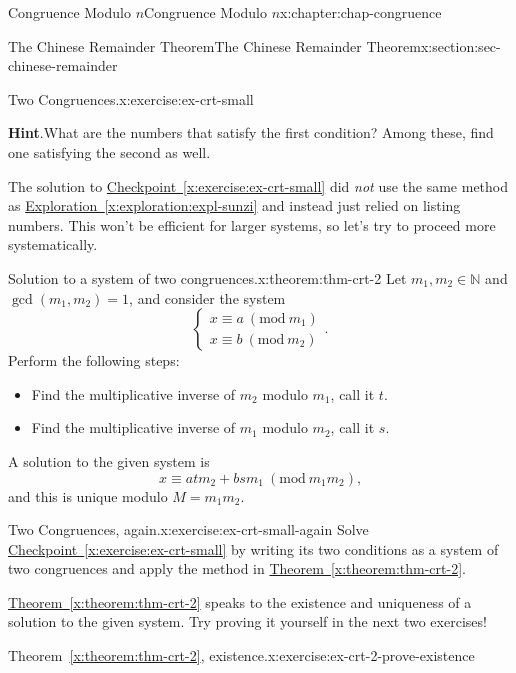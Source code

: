 \documentclass[oneside,10pt,]{book}
\newcommand{\blocktitlefont}{\relax}
\newcommand{\xreffont}{\relax}
\numberwithin{equation}{section}
\newcommand{\Mod}[1]{\ \left(\mathrm{mod}\ #1\right)}
\begin{document}
\begin{chapterptx}{Congruence Modulo \(n\)}{}{Congruence Modulo \(n\)}{}{}{x:chapter:chap-congruence}
\begin{sectionptx}{The Chinese Remainder Theorem}{}{The Chinese Remainder Theorem}{}{}{x:section:sec-chinese-remainder}
\begin{inlineexercise}{Two Congruences.}{x:exercise:ex-crt-small}
\par\smallskip%
\noindent\textbf{\blocktitlefont Hint}.\hypertarget{g:hint:id428586}{}\quad{}What are the numbers that satisfy the first condition? Among these, find one satisfying the second as well.%
\end{inlineexercise}
The solution to \hyperref[x:exercise:ex-crt-small]{Checkpoint~{\xreffont\ref{x:exercise:ex-crt-small}}} did \emph{not} use the same method as \hyperref[x:exploration:expl-sunzi]{Exploration~{\xreffont\ref{x:exploration:expl-sunzi}}} and instead just relied on listing numbers. This won't be efficient for larger systems, so let's try to proceed more systematically.%
\begin{theorem}{Solution to a system of two congruences.}{}{x:theorem:thm-crt-2}%
Let \(m_1,m_2 \in \mathbb{N}\) and \(\gcd(m_1,m_2) = 1\), and consider the system%
\begin{equation*}
\begin{cases} x \equiv a \Mod{m_1} \\ x \equiv b \Mod{m_2} \end{cases}\text{.}
\end{equation*}
Perform the following steps:%
\begin{itemize}[label=\textbullet]
\item{}Find the multiplicative inverse of \(m_2\) modulo \(m_1\), call it \(t\).%
\item{}Find the multiplicative inverse of \(m_1\) modulo \(m_2\), call it \(s\).%
\end{itemize}
A solution to the given system is%
\begin{equation*}
x \equiv atm_2 + bsm_1 \Mod{m_1m_2}\text{,}
\end{equation*}
and this is unique modulo \(M = m_1m_2\).%
\end{theorem}
\begin{inlineexercise}{Two Congruences, again.}{x:exercise:ex-crt-small-again}%
Solve \hyperref[x:exercise:ex-crt-small]{Checkpoint~{\xreffont\ref{x:exercise:ex-crt-small}}} by writing its two conditions as a system of two congruences and apply the method in \hyperref[x:theorem:thm-crt-2]{Theorem~{\xreffont\ref{x:theorem:thm-crt-2}}}.%
\end{inlineexercise}
\hyperref[x:theorem:thm-crt-2]{Theorem~{\xreffont\ref{x:theorem:thm-crt-2}}} speaks to the existence and uniqueness of a solution to the given system. Try proving it yourself in the next two exercises!%
\begin{inlineexercise}{Theorem~{\xreffont\ref*{x:theorem:thm-crt-2}}, existence.}{x:exercise:ex-crt-2-prove-existence}%

\end{inlineexercise}
\end{sectionptx}
\end{chapterptx}
\end{document}
